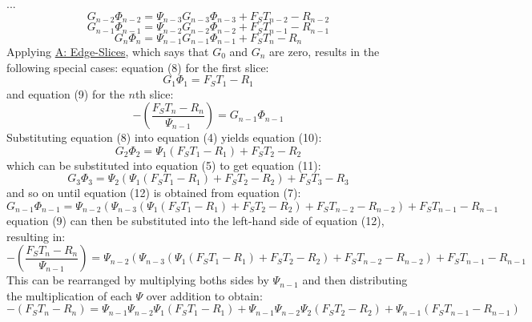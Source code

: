 \documentclass[12pt]{article}
\begin{document}
...
\begin{displaymath}
G_{n-2} Φ_{n-2}=Ψ_{n-3} G_{n-3} Φ_{n-3}+{F_{S}} T_{n-2}-R_{n-2}
\end{displaymath}
\begin{displaymath}
G_{n-1} Φ_{n-1}=Ψ_{n-2} G_{n-2} Φ_{n-2}+{F_{S}} T_{n-1}-R_{n-1}
\end{displaymath}
\begin{displaymath}
G_{n} Φ_{n}=Ψ_{n-1} G_{n-1} Φ_{n-1}+{F_{S}} T_{n}-R_{n}
\end{displaymath}
Applying \hyperref[A:Edge-Slices]{A: Edge-Slices}, which says that $G_{0}$ and $G_{n}$ are zero, results in the following special cases: equation (8) for the first slice:
\begin{displaymath}
G_{1} Φ_{1}={F_{S}} T_{1}-R_{1}
\end{displaymath}
and equation (9) for the $n$th slice:
\begin{displaymath}
-\left(\frac{{F_{S}} T_{n}-R_{n}}{Ψ_{n-1}}\right)=G_{n-1} Φ_{n-1}
\end{displaymath}
Substituting equation (8) into equation (4) yields equation (10):
\begin{displaymath}
G_{2} Φ_{2}=Ψ_{1} \left({F_{S}} T_{1}-R_{1}\right)+{F_{S}} T_{2}-R_{2}
\end{displaymath}
which can be substituted into equation (5) to get equation (11):
\begin{displaymath}
G_{3} Φ_{3}=Ψ_{2} \left(Ψ_{1} \left({F_{S}} T_{1}-R_{1}\right)+{F_{S}} T_{2}-R_{2}\right)+{F_{S}} T_{3}-R_{3}
\end{displaymath}
and so on until equation (12) is obtained from equation (7):
\begin{displaymath}
G_{n-1} Φ_{n-1}=Ψ_{n-2} \left(Ψ_{n-3} \left(Ψ_{1} \left({F_{S}} T_{1}-R_{1}\right)+{F_{S}} T_{2}-R_{2}\right)+{F_{S}} T_{n-2}-R_{n-2}\right)+{F_{S}} T_{n-1}-R_{n-1}
\end{displaymath}
equation (9) can then be substituted into the left-hand side of equation (12), resulting in:
\begin{displaymath}
-\left(\frac{{F_{S}} T_{n}-R_{n}}{Ψ_{n-1}}\right)=Ψ_{n-2} \left(Ψ_{n-3} \left(Ψ_{1} \left({F_{S}} T_{1}-R_{1}\right)+{F_{S}} T_{2}-R_{2}\right)+{F_{S}} T_{n-2}-R_{n-2}\right)+{F_{S}} T_{n-1}-R_{n-1}
\end{displaymath}
This can be rearranged by multiplying boths sides by $Ψ_{n-1}$ and then distributing the multiplication of each $Ψ$ over addition to obtain:
\begin{displaymath}
-\left({F_{S}} T_{n}-R_{n}\right)=Ψ_{n-1} Ψ_{n-2} Ψ_{1} \left({F_{S}} T_{1}-R_{1}\right)+Ψ_{n-1} Ψ_{n-2} Ψ_{2} \left({F_{S}} T_{2}-R_{2}\right)+Ψ_{n-1} \left({F_{S}} T_{n-1}-R_{n-1}\right)
\end{displaymath}
\end{document}
